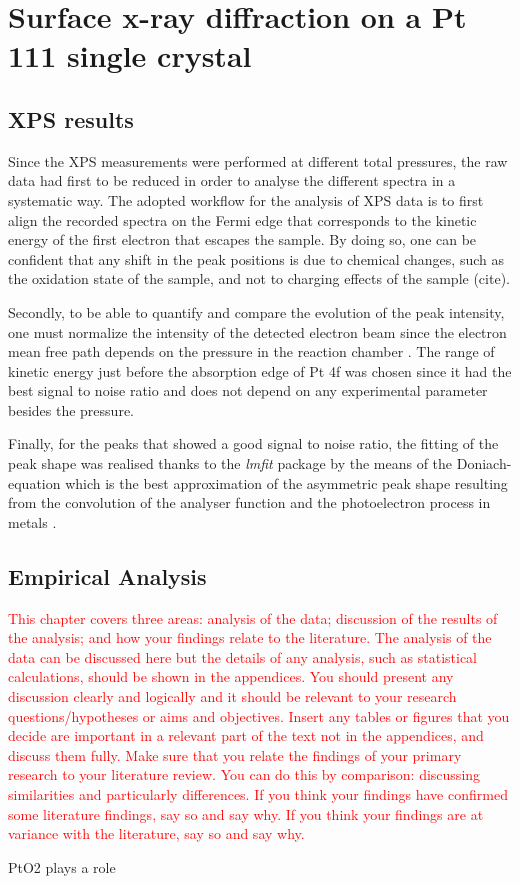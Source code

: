 \section{Surface x-ray diffraction on a Pt 111 single crystal} \label{sec:SXRD111}

\subsection{XPS results} \label{sec:XPS111}

Since the XPS measurements were performed at different total pressures, the raw data had first to be reduced in order to analyse the different spectra in a systematic way.
The adopted workflow for the analysis of XPS data is to first align the recorded spectra on the Fermi edge that corresponds to the kinetic energy of the first electron that escapes the sample.
By doing so, one can be confident that any shift in the peak positions is due to chemical changes, such as the oxidation state of the sample, and not to charging effects of the sample (cite).

Secondly, to be able to quantify and compare the evolution of the peak intensity, one must normalize the intensity of the detected electron beam since the electron mean free path depends on the pressure in the reaction chamber \parencite{Willmott}.
The range of kinetic energy just before the absorption edge of Pt 4f was chosen since it had the best signal to noise ratio and does not depend on any experimental parameter besides the pressure.

Finally, for the peaks that showed a good signal to noise ratio, the fitting of the peak shape was realised thanks to the \textit{lmfit} \parencite{Newville2016} package by the means of the Doniach-equation which is the best approximation of the asymmetric peak shape resulting from the convolution of the analyser function and the photoelectron process in metals \parencite{Doniach_1970}.

\subsection{Empirical Analysis}

\textcolor{red}{This chapter covers three areas: analysis of the data; discussion of the results of the analysis; and how your findings relate to the literature. The analysis of the data can be discussed here but the details of any analysis, such as statistical calculations, should be shown in the appendices. You should present any discussion clearly and logically and it should be relevant to your research questions/hypotheses or aims and objectives. Insert any tables or figures that you decide are important in a relevant part of the text not in the appendices, and discuss them fully. Make sure that you relate the findings of your primary research to your literature review. You can do this by comparison: discussing similarities and particularly differences. If you think your findings have confirmed some literature findings, say so and say why. If you think your findings are at variance with the literature, say so and say why.}


PtO2 plays a role \cite{McCabe1986, HANNEVOLD2005}